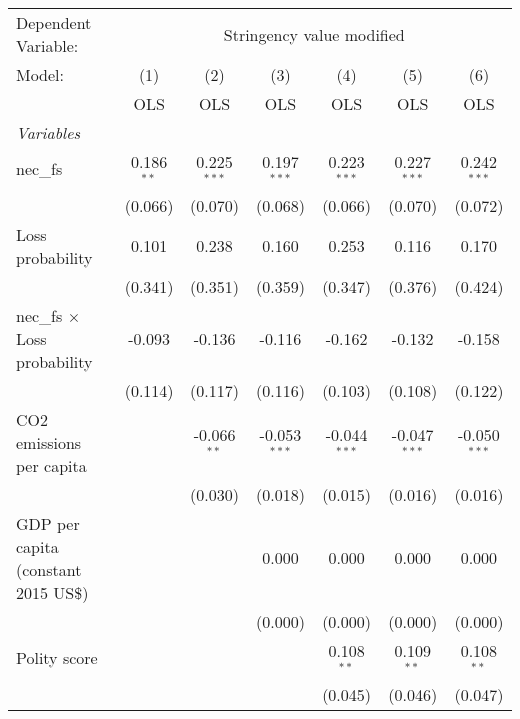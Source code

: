 
\begingroup
\centering
\begin{tabular}{lcccccc}
   \toprule
   Dependent Variable: & \multicolumn{6}{c}{Stringency value modified}\\
   Model:                               & (1)          & (2)           & (3)            & (4)            & (5)            & (6)\\  
                                        &  OLS         & OLS           & OLS            & OLS            & OLS            & OLS\\  
   \midrule
   \emph{Variables}\\
   nec\_fs                              & 0.186$^{**}$ & 0.225$^{***}$ & 0.197$^{***}$  & 0.223$^{***}$  & 0.227$^{***}$  & 0.242$^{***}$\\   
                                        & (0.066)      & (0.070)       & (0.068)        & (0.066)        & (0.070)        & (0.072)\\   
   Loss probability                     & 0.101        & 0.238         & 0.160          & 0.253          & 0.116          & 0.170\\   
                                        & (0.341)      & (0.351)       & (0.359)        & (0.347)        & (0.376)        & (0.424)\\   
   nec\_fs $\times$ Loss probability    & -0.093       & -0.136        & -0.116         & -0.162         & -0.132         & -0.158\\   
                                        & (0.114)      & (0.117)       & (0.116)        & (0.103)        & (0.108)        & (0.122)\\   
   CO2 emissions per capita             &              & -0.066$^{**}$ & -0.053$^{***}$ & -0.044$^{***}$ & -0.047$^{***}$ & -0.050$^{***}$\\   
                                        &              & (0.030)       & (0.018)        & (0.015)        & (0.016)        & (0.016)\\   
   GDP per capita (constant 2015 US\$)  &              &               & 0.000          & 0.000          & 0.000          & 0.000\\   
                                        &              &               & (0.000)        & (0.000)        & (0.000)        & (0.000)\\   
   Polity score                         &              &               &                & 0.108$^{**}$   & 0.109$^{**}$   & 0.108$^{**}$\\   
                                        &              &               &                & (0.045)        & (0.046)        & (0.047)\\   

\end{tabular}
